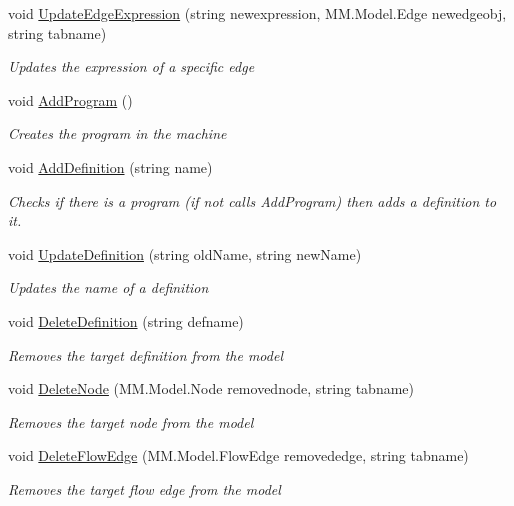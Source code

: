 \begin{DoxyCompactItemize}
void \hyperlink{class_model_controller_a06912800fa56c444b0a54a2e777460a0}{Update\+Edge\+Expression} (string newexpression, M\+M.\+Model.\+Edge newedgeobj, string tabname)
\begin{DoxyCompactList}\small\item\em Updates the expression of a specific edge \end{DoxyCompactList}\item 
void \hyperlink{class_model_controller_a366347bcb88a5d9741341cb42d9617b6}{Add\+Program} ()
\begin{DoxyCompactList}\small\item\em Creates the program in the machine \end{DoxyCompactList}\item 
void \hyperlink{class_model_controller_ae0ed52e43c07b4f6ed37488d5e3bd5e0}{Add\+Definition} (string name)
\begin{DoxyCompactList}\small\item\em Checks if there is a program (if not calls Add\+Program) then adds a definition to it. \end{DoxyCompactList}\item 
void \hyperlink{class_model_controller_ad8870c7c6be199c58b77cb4f3f666bea}{Update\+Definition} (string old\+Name, string new\+Name)
\begin{DoxyCompactList}\small\item\em Updates the name of a definition \end{DoxyCompactList}\item 
void \hyperlink{class_model_controller_a6a33ac19aff3ce293c7c2e4255e50470}{Delete\+Definition} (string defname)
\begin{DoxyCompactList}\small\item\em Removes the target definition from the model \end{DoxyCompactList}\item 
void \hyperlink{class_model_controller_ad9f66266f49a332182e57d2368801e5f}{Delete\+Node} (M\+M.\+Model.\+Node removednode, string tabname)
\begin{DoxyCompactList}\small\item\em Removes the target node from the model \end{DoxyCompactList}\item 
void \hyperlink{class_model_controller_af810eecc43d27f5790958b9900ff1215}{Delete\+Flow\+Edge} (M\+M.\+Model.\+Flow\+Edge removededge, string tabname)
\begin{DoxyCompactList}\small\item\em Removes the target flow edge from the model \end{DoxyCompactList}\item 

\end{DoxyCompactItemize}
